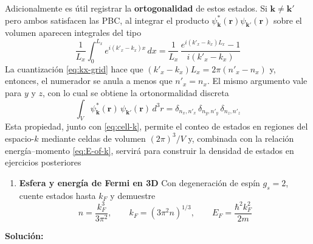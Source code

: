 \documentclass{article}
\newenvironment{AGbox}[1][7]%
{%
  \begin{tcolorbox}[
    enhanced, breakable,
    colframe=AppleGreen,
    colback=AppleGreen!#1,
    boxrule=1pt,
    borderline west={2mm}{-10mm}{AppleGreen},
    sharp corners=southwest,
    left=14pt,right=14pt,top=10pt,bottom=10pt,
     boxsep=6pt,
  ]%
}{%
  \end{tcolorbox}%
}
\begin{document}
Adicionalmente es útil registrar la \textcolor{Cerulean}{\textbf{ortogonalidad}} de estos estados. Si $\mathbf k\neq \mathbf k'$ pero ambos satisfacen las PBC, al integrar el producto $\psi_{\mathbf k}^*(\mathbf r)\psi_{\mathbf k'}(\mathbf r)$ sobre el volumen aparecen integrales del tipo
\begin{equation}\label{eq:orto-1D}
\frac{1}{L_x}\int_{0}^{L_x} e^{i(k'_x-k_x)x}\,dx
=\frac{1}{L_x}\,\frac{e^{i(k'_x-k_x)L_x}-1}{i(k'_x-k_x)}
\end{equation}
La cuantización \eqref{eq:kx-grid} hace que $(k'_x-k_x)L_x=2\pi(n'_x-n_x)$ y, entonces, el numerador se anula a menos que $n'_x=n_x$. El mismo argumento vale para $y$ y $z$, con lo cual se obtiene la ortonormalidad discreta
\begin{equation}\label{eq:ortonormalidad}
\int_V \psi_{\mathbf k}^{*}(\mathbf r)\,\psi_{\mathbf k'}(\mathbf r)\,d^3 r
=\delta_{n_x,n'_x}\,\delta_{n_y,n'_y}\,\delta_{n_z,n'_z}
\end{equation}
Esta propiedad, junto con \eqref{eq:cell-k}, permite el conteo de estados en regiones del espacio-$k$ mediante celdas de volumen $(2\pi)^3/V$ y, combinada con la relación energía–momento \eqref{eq:E-of-k}, servirá para construir la densidad de estados en ejercicios posteriores




\begin{AGbox}[8]
\begin{enumerate}[label={{\textcolor{trueblue}{\textbf{Pr.} \arabic*.5}}}, start=5]
  \item \textcolor{Cerulean}{\textbf{Esfera y energía de Fermi en 3D}}
  Con degeneración de espín $g_s=2$, cuente estados hasta $k_F$ y demuestre
  \begin{equation}\label{eq:n-kF}
    n=\frac{k_F^3}{3\pi^2},\qquad k_F=(3\pi^2 n)^{1/3},\qquad E_F=\frac{\hbar^2 k_F^2}{2m}
  \end{equation}
\end{enumerate}
\end{AGbox}

\vspace{0.5cm}\textcolor{Cinnabar}{\textbf{Solución:}}
\end{document}
